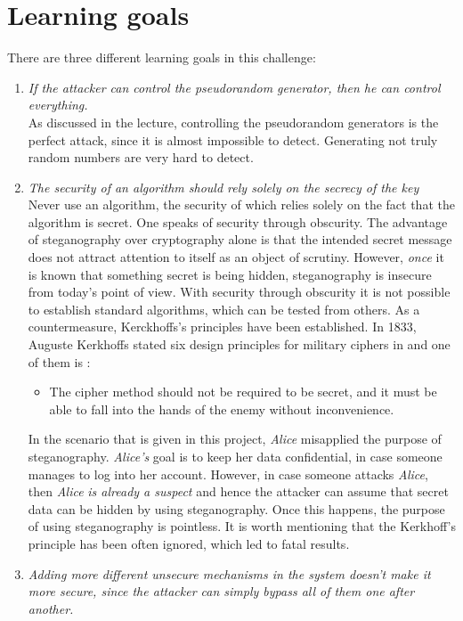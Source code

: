 \documentclass[11pt]{article}
\begin{document}
\section{Learning goals}
There are three different learning goals in this challenge:
\begin{enumerate}
\item \textit{If the attacker can control the pseudorandom generator, then he can control everything.} \\
	As discussed in the lecture, controlling the pseudorandom generators is the perfect attack, since it is almost impossible to detect. Generating not truly random numbers are very hard to detect. 
	
\item \textit{The security of an algorithm should rely solely on the secrecy of the key} \cite{katzlindell} \\
Never use an algorithm, the security of which relies solely on the fact that the algorithm is secret. One speaks of security through obscurity. The advantage of steganography over cryptography alone is that the intended secret message does not attract attention to itself as an object of scrutiny. However, \textit{once} it is known that something secret is being hidden, steganography is insecure from today’s point of view. With security through obscurity it is not possible to establish standard algorithms, which can be tested from others. As a countermeasure, Kerckhoffs's principles have been established. 
In 1833, Auguste Kerkhoffs stated six design principles for military ciphers in \cite{Kerckhoffs83} and one of them is \cite{katzlindell}:
\begin{itemize}
\item The cipher method should not be required to be secret, and it must be able to fall into the hands of the enemy without inconvenience.
\end{itemize}
In the scenario that is given in this project, \textit{Alice} misapplied the purpose of steganography. \textit{Alice's} goal is to keep her data confidential, in case someone manages to log into her account. However, in case someone attacks \textit{Alice}, then \textit{Alice} \textit{is already a suspect} and hence the attacker can assume that secret data can be hidden by using steganography. Once this happens, the purpose of using steganography is pointless. It is worth mentioning that the Kerkhoff's principle has been often ignored, which led to fatal results. 
	\item \textit{Adding more different unsecure mechanisms in the system doesn't make it more secure, since the attacker can simply bypass all of them one after another.}\\
	
\end{enumerate}
\end{document}
